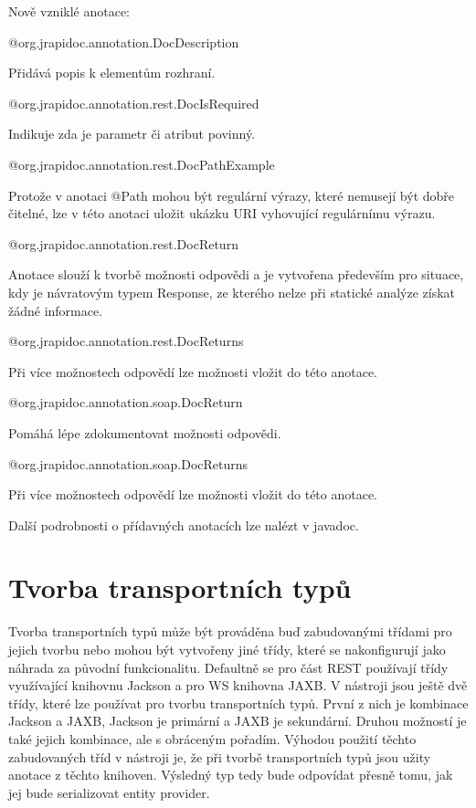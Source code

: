 \documentclass[11pt,twoside,a4paper]{book}
\begin{document}
Nově vzniklé anotace:

@org.jrapidoc.annotation.DocDescription

Přidává popis k elementům rozhraní.

@org.jrapidoc.annotation.rest.DocIsRequired

Indikuje zda je parametr či atribut povinný.

@org.jrapidoc.annotation.rest.DocPathExample

Protože v anotaci @Path mohou být regulární výrazy, které nemusejí být dobře čitelné, lze v
této anotaci uložit ukázku URI vyhovující regulárnímu výrazu.

@org.jrapidoc.annotation.rest.DocReturn

Anotace slouží k tvorbě možnosti odpovědi a je vytvořena především pro situace, kdy je
návratovým typem Response, ze kterého nelze při statické analýze získat žádné informace.

@org.jrapidoc.annotation.rest.DocReturns

Při více možnostech odpovědí lze možnosti vložit do této anotace.

@org.jrapidoc.annotation.soap.DocReturn

Pomáhá lépe zdokumentovat možnosti odpovědi.

@org.jrapidoc.annotation.soap.DocReturns

Při více možnostech odpovědí lze možnosti vložit do této anotace.

Další podrobnosti o přídavných anotacích lze nalézt v javadoc.

\section{Tvorba transportních typů}

Tvorba transportních typů může být prováděna buď zabudovanými třídami pro jejich tvorbu
nebo mohou být vytvořeny jiné třídy, které se nakonfigurují jako náhrada za původní
funkcionalitu. Defaultně se pro část REST používají třídy využívající knihovnu Jackson a pro
WS knihovna JAXB. V nástroji jsou ještě dvě třídy, které lze používat pro tvorbu
transportních typů. První z nich je kombinace Jackson a JAXB, Jackson je primární a JAXB
je sekundární. Druhou možností je také jejich kombinace, ale s obráceným pořadím. Výhodou
použití těchto zabudovaných tříd v nástroji je, že při tvorbě transportních typů jsou užity
anotace z těchto knihoven. Výsledný typ tedy bude odpovídat přesně tomu, jak jej bude
serializovat entity provider.
\end{document}
